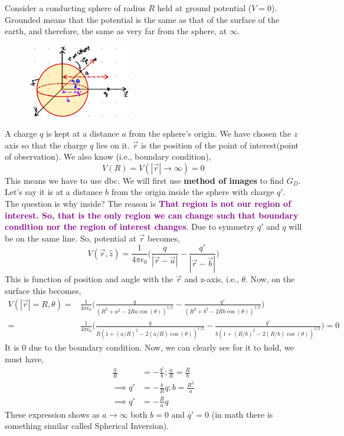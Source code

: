 \documentclass{article}
\begin{document}
Consider a conducting sphere of radius $R$ held at ground potential ($V = 0$). Grounded means that the potential is the same as that of the surface of the earth, and therefore, the same as very far from the sphere, at $\infty$.
    \begin{figure}[H]
\centering
\includegraphics[width=0.4\textwidth]{Images/sph_imag_1.jpeg}
\caption{}
\label{met_img1}
\end{figure}
A charge $q$ is kept at a distance $a$ from the sphere's origin. We have chosen the $z$ axis so that the charge $q$ lies on it. $\vec{r}$ is the position of the point of interest(point of observation). We also know (i.e., boundary condition),
\begin{equation}
    V(R) = V(|\vec{r}|\to \infty) = 0
\end{equation}
This means we have to use \gls{dbc}. We will first use \textbf{method of images} to find $G_D$. Let's say it is at a distance $b$ from the origin inside the sphere with charge $q'$. The question is why inside? The reason is \textcolor{purple}{\textbf{That region is not our region of interest. So, that is the only region we can change such that boundary condition nor the region of interest changes}}. Due to symmetry $q'$ and $q$ will be on the same line. So, potential at $\vec{r}$ becomes,
\begin{equation}
    V(\vec{r},\hat{z}) = \frac{1}{4\pi \epsilon_0}\Bigg( \frac{q}{|\vec{r}-\vec{a}|} - \frac{q'}{|\vec{r}-\vec{b}|}\Bigg)
\end{equation}
This is function of position and angle with the $\vec{r}$ and z-axis, i.e., $\theta$. Now, on the surface this becomes,
\begin{equation*}
\begin{split}
    V(|\vec{r}|=R,\theta) =& \frac{1}{4\pi \epsilon_0}\Bigg( \frac{q}{(R^2+a^2-2R a\cos(\theta))^{1/2}} - \frac{q'}{(R^2+b^2-2R b\cos(\theta))^{1/2}}\Bigg)\\
    =& \frac{1}{4\pi \epsilon_0}\Bigg( \frac{q}{R(1+(a/R)^2-2(a/R)\cos(\theta))^{1/2}} - \frac{q'}{b(1+(R/b)^2-2 (R/b)\cos(\theta))^{1/2}}\Bigg) = 0
\end{split}
\end{equation*}
It is $0$ due to the boundary condition. Now, we can clearly see for it to hold, we must have,
\begin{equation}
    \begin{split}
        \frac{q}{R} &= -\frac{q'}{b} ; \frac{a}{R} = \frac{R}{b}\\
        \implies q' &= -\frac{b}{R}q ; b = \frac{R^2}{a}\\
        \implies q' &= -\frac{R}{a}q
    \end{split}
\end{equation}
These expression shows as $a\to \infty$ both $b=0$ and $q'=0$ (in math there is something similar called Spherical Inversion).
\end{document}
